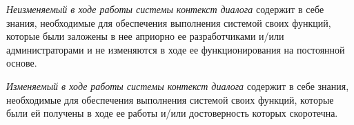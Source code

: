 {\begin{SCn}

    \begin{scnindent}
        \begin{scneqtoset}
        \end{scneqtoset}
    \end{scnindent}

\end{SCn}

\textit{Неизменяемый в ходе работы системы контекст диалога} содержит в себе знания, необходимые для обеспечения выполнения системой своих функций,  которые были заложены в нее априорно ее разработчиками и/или администраторами и не изменяются в ходе ее функционирования на постоянной основе.

\textit{Изменяемый в ходе работы системы контекст диалога} содержит в себе знания, необходимые для обеспечения выполнения системой своих функций,  которые были ей получены в ходе ее работы и/или достоверность которых скоротечна.

\begin{SCn}


    \begin{scnindent}
        \begin{scneqtoset}
        \end{scneqtoset}
    \end{scnindent}
    \begin{scnindent}
        \begin{scneqtoset}
        \end{scneqtoset}
    \end{scnindent}


\end{SCn}}

